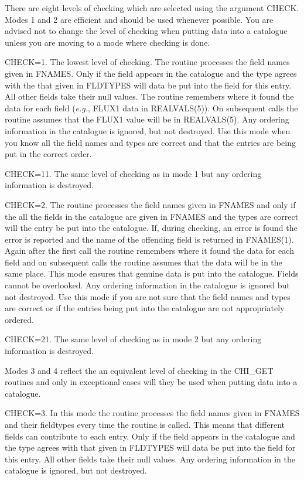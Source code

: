 \documentclass[11pt,nolof]{starlink}
\begin{document}
\begin{small}
{{      There are eight levels of checking which are selected using the argument
      CHECK. Modes 1 and 2 are efficient and should be used whenever possible.
      You are advised not to change the level of checking when putting data
      into a catalogue unless you are moving to a mode where checking is done.

      CHECK=1. The lowest level of checking. The routine processes the field
      names given in FNAMES. Only if the field appears in the catalogue and
      the type agrees with the that given in FLDTYPES will data be put into
      the field for this entry. All other fields take their null values. The
      routine remembers where it found the data for each field (\emph{e.g.}, FLUX1 data
      in REALVALS(5)). On subsequent calls the routine assumes that the FLUX1
      value will be in REALVALS(5). Any ordering information in the catalogue
      is ignored, but not destroyed. Use this mode when you know all the field
      names and types are correct and that the entries are being put in the
      correct order.

      CHECK=11. The same level of checking as in mode 1 but any ordering
      information is destroyed.

      CHECK=2. The routine processes the field names given in FNAMES and only
      if the all the fields in the catalogue are given in FNAMES and the
      types are correct will the entry be put into the catalogue. If, during
      checking, an error is found the error is reported and the name of the
      offending field is returned in FNAMES(1). Again after
      the first call the routine remembers where it found the data for each
      field and on subsequent calls the routine assumes that the data will be
      in the same place. This mode ensures that genuine data is put into the
      catalogue. Fields cannot be overlooked. Any ordering information in the
      catalogue is ignored but not destroyed. Use this mode if you are not
      sure that the field
      names and types are correct or if the entries being put into the
      catalogue are not appropriately ordered.

      CHECK=21. The same level of checking as in mode 2 but any ordering
      information is destroyed.

      Modes 3 and 4 reflect the an equivalent level of checking in the
      CHI\_GET routines and only in exceptional cases will they be used
      when putting data into a catalogue.

      CHECK=3. In this mode the routine processes the field names given in
      FNAMES and their fieldtypes every time the routine is called. This means
      that different fields can contribute to each entry. Only if the field
      appears in the catalogue and
      the type agrees with that given in FLDTYPES will data be put into
      the field for this entry. All other fields take their null values.
      Any ordering information in the catalogue
      is ignored, but not destroyed.

}}
\end{small}
\end{document}
